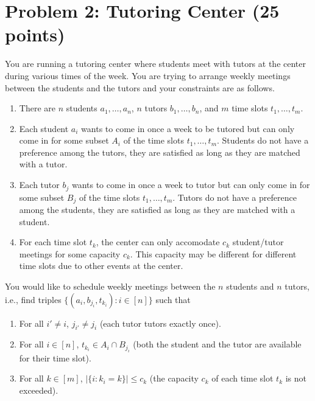 \documentclass[12pt]{article}
\begin{document}
\section*{Problem 2: Tutoring Center (25 points)}
You are running a tutoring center where students meet with tutors at the center during various times of the week. You are trying to arrange weekly meetings between the students and the tutors and your constraints are as follows.
\begin{enumerate}
\item There are $n$ students $a_1,\ldots,a_n$, $n$ tutors $b_1,\ldots,b_n$, and $m$ time slots $t_1,\ldots,t_m$.
\item Each student $a_i$ wants to come in once a week to be tutored but can only come in for some subset $A_i$ of the time slots $t_1,\ldots,t_m$. Students do not have a preference among the tutors, they are satisfied as long as they are matched with a tutor.
\item Each tutor $b_j$ wants to come in once a week to tutor but can only come in for some subset $B_j$ of the time slots $t_1,\ldots,t_m$. Tutors do not have a preference among the students, they are satisfied as long as they are matched with a student.
\item For each time slot $t_k$, the center can only accomodate $c_k$ student/tutor meetings for some capacity $c_k$. This capacity may be different for different time slots due to other events at the center.
\end{enumerate}
You would like to schedule weekly meetings between the $n$ students and $n$ tutors, i.e., find triples $\{(a_i,b_{j_i},t_{k_i}): i \in [n]\}$ such that 
\begin{enumerate}
\item For all $i' \neq i$, $j_{i'} \neq j_{i}$ (each tutor tutors exactly once).
\item For all $i \in [n]$, $t_{k_i} \in A_i \cap B_{j_i}$ (both the student and the tutor are available for their time slot).
\item For all $k \in [m]$, $|\{i: k_i = k\}| \leq c_k$ (the capacity $c_k$ of each time slot $t_k$ is not exceeded).
\end{enumerate}
\end{document}
